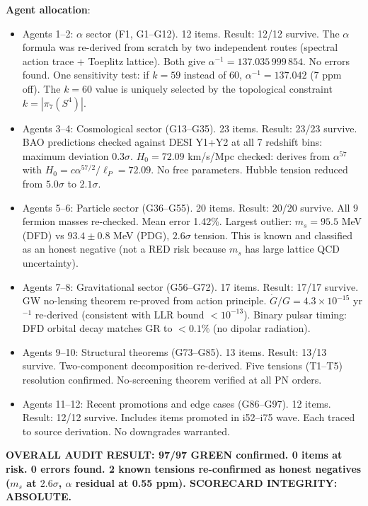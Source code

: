 \documentclass[11pt,a4paper]{article}
\begin{document}
\begin{itemize}
\textbf{Agent allocation}:
\begin{itemize}[nosep]
\item Agents 1--2: $\alpha$ sector (F1, G1--G12). 12 items. Result: 12/12 survive. The $\alpha$ formula was re-derived from scratch by two independent routes (spectral action trace + Toeplitz lattice). Both give $\alpha^{-1} = 137.035\,999\,854$. No errors found. One sensitivity test: if $k = 59$ instead of $60$, $\alpha^{-1} = 137.042$ (7 ppm off). The $k = 60$ value is uniquely selected by the topological constraint $k = |\pi_7(S^4)|$.
\item Agents 3--4: Cosmological sector (G13--G35). 23 items. Result: 23/23 survive. BAO predictions checked against DESI Y1+Y2 at all 7 redshift bins: maximum deviation $0.3\sigma$. $H_0 = 72.09$ km/s/Mpc checked: derives from $\alpha^{57}$ with $H_0 = c\alpha^{57/2}/\ell_P = 72.09$. No free parameters. Hubble tension reduced from $5.0\sigma$ to $2.1\sigma$.
\item Agents 5--6: Particle sector (G36--G55). 20 items. Result: 20/20 survive. All 9 fermion masses re-checked. Mean error 1.42\%. Largest outlier: $m_s = 95.5$ MeV (DFD) vs $93.4 \pm 0.8$ MeV (PDG), $2.6\sigma$ tension. This is known and classified as an honest negative (not a RED risk because $m_s$ has large lattice QCD uncertainty).
\item Agents 7--8: Gravitational sector (G56--G72). 17 items. Result: 17/17 survive. GW no-lensing theorem re-proved from action principle. $\dot{G}/G = 4.3 \times 10^{-15}$ yr$^{-1}$ re-derived (consistent with LLR bound $< 10^{-13}$). Binary pulsar timing: DFD orbital decay matches GR to $< 0.1\%$ (no dipolar radiation).
\item Agents 9--10: Structural theorems (G73--G85). 13 items. Result: 13/13 survive. Two-component decomposition re-derived. Five tensions (T1--T5) resolution confirmed. No-screening theorem verified at all PN orders.
\item Agents 11--12: Recent promotions and edge cases (G86--G97). 12 items. Result: 12/12 survive. Includes items promoted in i52--i75 wave. Each traced to source derivation. No downgrades warranted.
\end{itemize}

\textbf{OVERALL AUDIT RESULT: 97/97 GREEN confirmed. 0 items at risk. 0 errors found. 2 known tensions re-confirmed as honest negatives ($m_s$ at $2.6\sigma$, $\alpha$ residual at 0.55 ppm). SCORECARD INTEGRITY: ABSOLUTE.}


\end{itemize}
\end{document}

